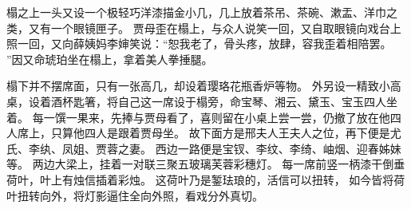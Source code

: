 榻之上一头又设一个极轻巧洋漆描金小几，几上放着茶吊、茶碗、漱盂、洋巾之类，又有一个眼镜匣子。
贾母歪在榻上，与众人说笑一回，又自取眼镜向戏台上照一回，又向薛姨妈李婶笑说：“恕我老了，骨头疼，放肆，容我歪着相陪罢。
”因又命琥珀坐在榻上，拿着美人拳捶腿。
\par
榻下并不摆席面，只有一张高几，却设着璎珞花瓶香炉等物。
外另设一精致小高桌，设着酒杯匙箸，将自己这一席设于榻旁，命宝琴、湘云、黛玉、宝玉四人坐着。
每一馔一果来，先捧与贾母看了，喜则留在小桌上尝一尝，仍撤了放在他四人席上，只算他四人是跟着贾母坐。
故下面方是邢夫人王夫人之位，再下便是尤氏、李纨、凤姐、贾蓉之妻。
西边一路便是宝钗、李纹、李绮、岫烟、迎春姊妹等。
两边大梁上，挂着一对联三聚五玻璃芙蓉彩穗灯。
每一席前竖一柄漆干倒垂荷叶，叶上有烛信插着彩烛。
这荷叶乃是錾珐琅的，活信可以扭转，
如今皆将荷叶扭转向外，将灯影逼住全向外照，看戏分外真切。
